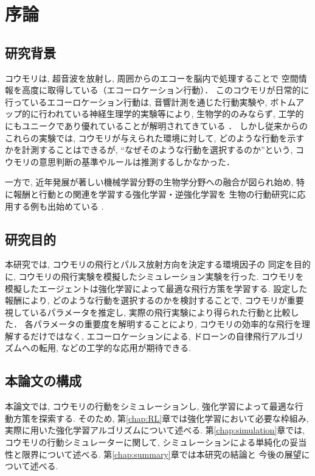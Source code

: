 \documentclass[../main]{subfiles}
\begin{document}
\newpage
\chapter{序論}

\section{研究背景}
コウモリは, 超音波を放射し, 周囲からのエコーを脳内で処理することで
空間情報を高度に取得している（エコーロケーション行動）．
このコウモリが日常的に行っているエコーロケーション行動は, 
音響計測を通じた行動実験や, 
ボトムアップ的に行われている神経生理学的実験等により, 
生物学的のみならず, 
工学的にもユニークであり優れていることが解明されてきている
\cite{ref:bat_enhance}\cite{ref:echolocating_bats}．
しかし従来からのこれらの実験では, 
コウモリが与えられた環境に対して, 
どのような行動を示すかを計測することはできるが, 
“なぜそのような行動を選択するのか”という, 
コウモリの意思判断の基準やルールは推測するしかなかった．

一方で, 近年発展が著しい機械学習分野の生物学分野への融合が図られ始め, 
特に報酬と行動との関連を学習する強化学習・逆強化学習を
生物の行動研究に応用する例も出始めている
\cite{ref:simulating_bout}\cite{ref:can_ai}.


\section{研究目的}
本研究では, コウモリの飛行とパルス放射方向を決定する環境因子の
同定を目的に, コウモリの飛行実験を模擬したシミュレーション実験を行った.
コウモリを模擬したエージェントは強化学習によって最適な飛行方策を学習する.
設定した報酬により, どのような行動を選択するのかを検討することで, 
コウモリが重要視しているパラメータを推定し, 
実際の飛行実験により得られた行動と比較した．
各パラメータの重要度を解明することにより, 
コウモリの効率的な飛行を理解するだけではなく, 
エコーロケーションによる, 
ドローンの自律飛行アルゴリズムへの転用, 
などの工学的な応用が期待できる.

\section{本論文の構成}
本論文では, コウモリの行動をシミュレーションし, 
強化学習によって最適な行動方策を探索する.
そのため, 第\ref{chap:RL}章では強化学習において必要な枠組み, 
実際に用いた強化学習アルゴリズムについて述べる.
第\ref{chap:simulation}章では, 
コウモリの行動シミュレーターに関して, 
シミュレーションによる単純化の妥当性と限界について述べる.
第\ref{chap:summary}章では本研究の結論と
今後の展望について述べる.
\end{document}
